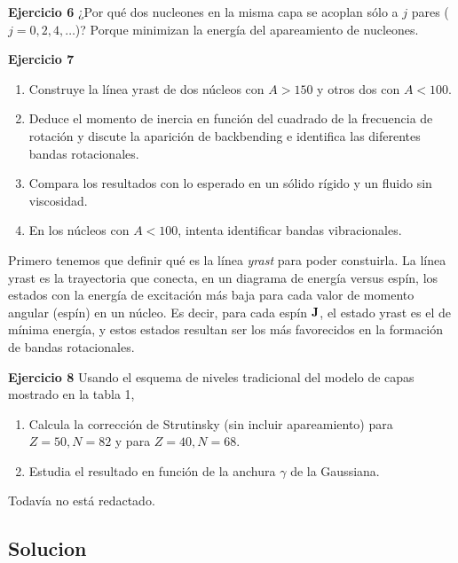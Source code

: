 

\begin{texercise}
    \textbf{Ejercicio 6}
    ¿Por qué dos nucleones en la misma capa se acoplan sólo a $j$ pares ($j = 0, 2, 4, \dots$)?
\tcblower
    Porque minimizan la energía del apareamiento de nucleones.
\end{texercise}




\begin{texercise}
    \textbf{Ejercicio 7}
    \begin{enumerate}
        \item Construye la línea yrast de dos núcleos con $A>150$ y otros dos con $A<100$.
        \item Deduce el momento de inercia en función del cuadrado de la frecuencia de rotación y discute la aparición de backbending e identifica las diferentes bandas rotacionales.
        \item Compara los resultados con lo esperado en un sólido rígido y un fluido sin viscosidad.
        \item En los núcleos con $A<100$, intenta identificar bandas vibracionales.
    \end{enumerate}
\tcblower
    Primero tenemos que definir qué es la línea \textit{yrast} para poder constuirla. La línea yrast es la trayectoria que conecta, en un diagrama de energía versus espín, los estados con la energía de excitación más baja para cada valor de momento angular (espín) en un núcleo. Es decir, para cada espín $\mathbf{J}$, el estado yrast es el de mínima energía, y estos estados resultan ser los más favorecidos en la formación de bandas rotacionales. 
\end{texercise}




\begin{texercise}
    \textbf{Ejercicio 8}
    Usando el esquema de niveles tradicional del modelo de capas mostrado en la tabla 1,
    \begin{enumerate}
        \item Calcula la corrección de Strutinsky (sin incluir apareamiento) para $Z=50, N=82$ y para $Z=40, N=68$.
        \item Estudia el resultado en función de la anchura $\gamma$ de la Gaussiana.
    \end{enumerate}
\tcblower
Todavía no está redactado.
\end{texercise}


\tcbstoprecording


\subsection{Solucion}
\tcbinputrecords